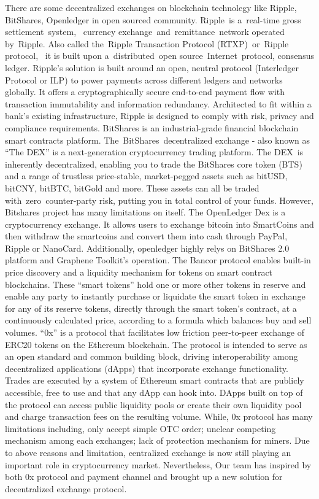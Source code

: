 \documentclass[UTF8,nofonts]{article}
\begin{document}
There are some decentralized exchanges on blockchain technolegy like Ripple,  BitShares,  Openledger in open sourced community.
Ripple\cite{schwartz2014ripple} is a real-time gross settlement system,  currency exchange and remittance network operated by Ripple. Also called the Ripple Transaction Protocol (RTXP) or Ripple protocol,  it is built upon a distributed open source Internet protocol,  consensus ledger. Ripple’s solution is built around an open,  neutral protocol (Interledger Protocol or ILP\cite{thomas2015protocol}) to power payments across different ledgers and networks globally. It offers a cryptographically secure end-to-end payment flow with transaction immutability and information redundancy. Architected to fit within a bank’s existing infrastructure,  Ripple is designed to comply with risk,  privacy and compliance requirements.
BitShares\cite{schuhbitshares}\cite{schuh2015bitshares} is an industrial-grade financial blockchain smart contracts platform. The BitShares decentralized exchange - also known as “The DEX” is a next-generation cryptocurrency trading platform. The DEX is inherently decentralized,  enabling you to trade the BitShares core token (BTS) and a range of trustless price-stable,  market-pegged assets such as bitUSD,  bitCNY,  bitBTC,  bitGold and more. These assets can all be traded with zero counter-party risk,  putting you in total control of your funds. However,  Bitshares project has many limitations on itself.
The OpenLedger Dex\cite{openledger} is a cryptocurrency exchange. It allows users to exchange bitcoin into SmartCoins and then withdraw the smartcoins and convert them into cash through PayPal,  Ripple or NanoCard. Additionally,  openledger highly relys on BitShares 2.0 platform and Graphene Toolkit’s operation.
The Bancor\cite{bancor}\cite{hanson2012logarithmic} protocol enables built-in price discovery and a liquidity mechanism for tokens on smart contract blockchains. These “smart tokens” hold one or more other tokens in reserve and enable any party to instantly purchase or liquidate the smart token in exchange for any of its reserve tokens,  directly through the smart token’s contract,  at a continuously calculated price, according to a formula which balances buy and sell volumes.
“0x”\cite{warren20170x} is a protocol that facilitates low friction peer-to-peer exchange of ERC20\cite{ERC20} tokens on the Ethereum blockchain. The protocol is intended to serve as an open standard and common building block,  driving interoperability among decentralized applications (dApps) that incorporate exchange functionality. Trades are executed by a system of Ethereum smart contracts that are publicly accessible,  free to use and that any dApp can hook into. DApps built on top of the protocol can access public liquidity pools or create their own liquidity pool and charge transaction fees on the resulting volume. While,  0x protocol has many limitations including,  only accept simple OTC order; unclear competing mechanism among each exchanges; lack of protection mechanism for miners.
Due to above reasons and limitation,  centralized exchange is now still playing an important role in cryptocurrency market. Nevertheless,  Our team has inspired by both 0x protocol and payment channel and brought up a new solution for decentralized exchange protocol.
\end{document}
